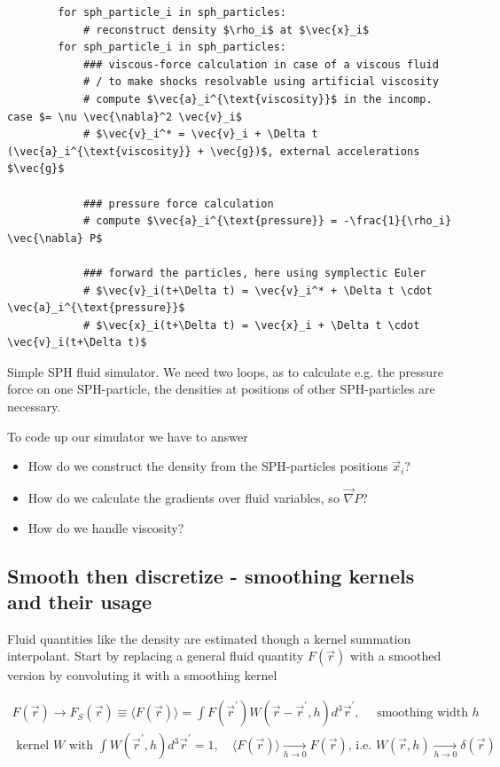 \begin{codebox}[!htb]
    \begin{verbatim}
        for sph_particle_i in sph_particles:
            # reconstruct density $\rho_i$ at $\vec{x}_i$
        for sph_particle_i in sph_particles:
            ### viscous-force calculation in case of a viscous fluid
            # / to make shocks resolvable using artificial viscosity
            # compute $\vec{a}_i^{\text{viscosity}}$ in the incomp. case $= \nu \vec{\nabla}^2 \vec{v}_i$
            # $\vec{v}_i^* = \vec{v}_i + \Delta t (\vec{a}_i^{\text{viscosity}} + \vec{g})$, external accelerations $\vec{g}$

            ### pressure force calculation
            # compute $\vec{a}_i^{\text{pressure}} = -\frac{1}{\rho_i} \vec{\nabla} P$

            ### forward the particles, here using symplectic Euler
            # $\vec{v}_i(t+\Delta t) = \vec{v}_i^* + \Delta t \cdot \vec{a}_i^{\text{pressure}}$
            # $\vec{x}_i(t+\Delta t) = \vec{x}_i + \Delta t \cdot \vec{v}_i(t+\Delta t)$
    \end{verbatim}
    \caption{Simple SPH fluid simulator. We need two loops, as to calculate e.g. the pressure force on one SPH-particle, the densities at positions of other SPH-particles are necessary.}
    \label{code:sph}
\end{codebox}

To code up our simulator we have to answer
\begin{itemize}
    \item How do we construct the density from the SPH-particles positions $\vec{x}_i$?
    \item How do we calculate the gradients over fluid variables, so $\vec{\nabla}P$?
    \item How do we handle viscosity?
\end{itemize}

\subsection{Smooth then discretize - smoothing kernels and their usage}
Fluid quantities like the density are estimated though a kernel summation interpolant.
Start by replacing a general fluid quantity $F(\vec{r})$ with a smoothed version
by convoluting it with a smoothing kernel

\begin{equation}
    \begin{gathered}
        F(\vec{r}) \rightarrow F_S(\vec{r}) \equiv\langle F(\vec{r})\rangle=\int F\left(\vec{r}^{\prime}\right) W\left(\vec{r}-\vec{r}^{\prime}, h\right) d^3 \vec{r}^{\prime}, \quad \text { smoothing width } h \\
        \text { kernel } W \text { with } \int W\left(\vec{r}^{\prime}, h\right) d^3 \vec{r}^{\prime}=1, \quad\langle F(\vec{r})\rangle \underset{h \rightarrow 0}{\longrightarrow} F(\vec{r}) \text {, i.e. } W(\vec{r}, h) \underset{h \rightarrow 0}{\longrightarrow} \delta(\vec{r})
    \end{gathered}
\end{equation}

